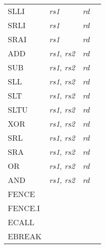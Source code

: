 \begin{tabular}{p{25mm}|p{3cm}|p{6cm}|p{4cm}}
   \cline{2-3}
   SLLI & {\em rs1} & {\em rd} &  \\
   \cline{2-3}
   SRLI & {\em rs1} & {\em rd} &  \\
   \cline{2-3}
   SRAI & {\em rs1} & {\em rd} &  \\
   \cline{2-3}
   ADD & {\em rs1}, {\em rs2} & {\em rd} &  \\
   \cline{2-3}
   SUB & {\em rs1}, {\em rs2} & {\em rd} &  \\
   \cline{2-3}
   SLL & {\em rs1}, {\em rs2} & {\em rd} &  \\
   \cline{2-3}
   SLT & {\em rs1}, {\em rs2} & {\em rd} &  \\
   \cline{2-3}
   SLTU & {\em rs1}, {\em rs2} & {\em rd} &  \\
   \cline{2-3}
   XOR & {\em rs1}, {\em rs2} & {\em rd} &  \\
   \cline{2-3}
   SRL & {\em rs1}, {\em rs2} & {\em rd} &  \\
   \cline{2-3}
   SRA & {\em rs1}, {\em rs2} & {\em rd} &  \\
   \cline{2-3}
   OR & {\em rs1}, {\em rs2} & {\em rd} &  \\
   \cline{2-3}
   AND & {\em rs1}, {\em rs2} & {\em rd} &  \\
   \cline{2-3}
   FENCE &  &  &  \\
   \cline{2-3}
   FENCE.I &  &  &  \\
   \cline{2-3}
   ECALL &  &  &  \\
   \cline{2-3}
   EBREAK &  &  &  \\
   \cline{2-3}
\end{tabular}

